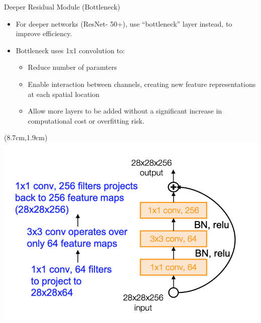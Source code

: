 \documentclass[serif, aspectratio=169]{beamer}
\begin{document}
\begin{frame}{Deeper Residual Module (Bottleneck)}
	\begin{itemize}
		\item For deeper networks (ResNet- 50+), use \newline ``bottleneck'' layer instead, to improve \newline efficiency.
		\item Bottleneck uses 1x1 convolution to:
		 \begin{itemize}
		 	\item Reduce number of paramters
		 	\item Enable interaction between channels, \newline creating new feature representations at \newline each spatial location
		 	\item Allow more layers to be added without \newline a significant increase in computational \newline cost or overfitting risk.
		 \end{itemize}
	\end{itemize}

	\begin{textblock*}{5cm}(8.7cm,1.9cm) %
		\includegraphics[keepaspectratio, scale=0.27]{pic/res_arch3}
	\end{textblock*}
\end{frame}
\end{document}
